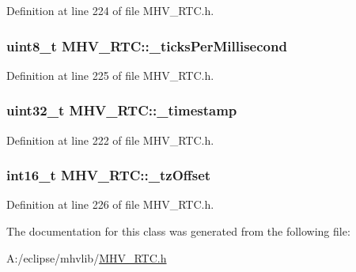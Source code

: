 Definition at line 224 of file M\-H\-V\-\_\-\-R\-T\-C.\-h.

\hypertarget{class_m_h_v___r_t_c_a48e7d03e90e78881ed8833d6e4f77b36}{
\subsubsection[{\-\_\-ticks\-Per\-Millisecond}]{\setlength{\rightskip}{0pt plus 5cm}uint8\-\_\-t M\-H\-V\-\_\-\-R\-T\-C\-::\-\_\-ticks\-Per\-Millisecond\hspace{0.3cm}{\ttfamily [protected]}}}\label{class_m_h_v___r_t_c_a48e7d03e90e78881ed8833d6e4f77b36}


Definition at line 225 of file M\-H\-V\-\_\-\-R\-T\-C.\-h.

\hypertarget{class_m_h_v___r_t_c_a6ac0d6f1b8985cd6113249693da50104}{
\subsubsection[{\-\_\-timestamp}]{\setlength{\rightskip}{0pt plus 5cm}uint32\-\_\-t M\-H\-V\-\_\-\-R\-T\-C\-::\-\_\-timestamp\hspace{0.3cm}{\ttfamily [protected]}}}\label{class_m_h_v___r_t_c_a6ac0d6f1b8985cd6113249693da50104}


Definition at line 222 of file M\-H\-V\-\_\-\-R\-T\-C.\-h.

\hypertarget{class_m_h_v___r_t_c_af9e544307713892ec196261247213490}{
\subsubsection[{\-\_\-tz\-Offset}]{\setlength{\rightskip}{0pt plus 5cm}int16\-\_\-t M\-H\-V\-\_\-\-R\-T\-C\-::\-\_\-tz\-Offset\hspace{0.3cm}{\ttfamily [protected]}}}\label{class_m_h_v___r_t_c_af9e544307713892ec196261247213490}


Definition at line 226 of file M\-H\-V\-\_\-\-R\-T\-C.\-h.



The documentation for this class was generated from the following file\-:\begin{DoxyCompactItemize}
\item 
A\-:/eclipse/mhvlib/\hyperlink{_m_h_v___r_t_c_8h}{M\-H\-V\-\_\-\-R\-T\-C.\-h}\end{DoxyCompactItemize}
